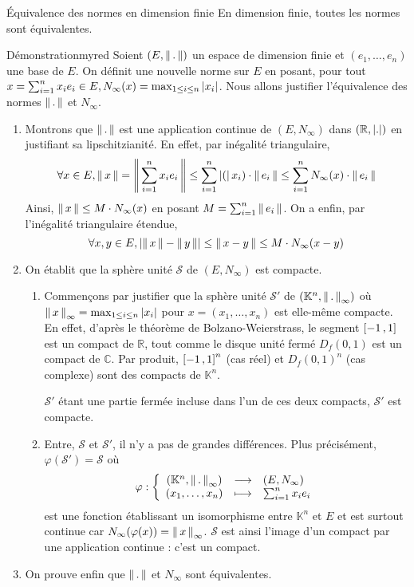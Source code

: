     \begin{theo}{Équivalence des normes en dimension finie}
        En dimension finie, toutes les normes sont équivalentes.
    \end{theo}

    \begin{demo}{Démonstration}{myred}
        Soient $\left(E, \left\lVert\,.\,\right\rVert\right)$ un espace de dimension finie et $(e_1,\ldots,e_n)$ une base de $E$. On définit une nouvelle norme sur $E$ en posant, pour tout $x = \sum_{i = 1}^n x_i e_i \in E, N_{\infty}(x) = \max_{1 \leq i \leq n} \left\lvert x_i\right\rvert$. Nous allons justifier l’équivalence des normes $\left\lVert\,.\,\right\rVert$ et $N_{\infty}$.
        \begin{enumerate}
            \item Montrons que $\left\lVert\,.\,\right\rVert$ est une application continue de $(E,N_{\infty})$ dans $(\mathbb{R}, \left\lvert .\right\rvert)$ en justifiant sa lipschitzianité. En effet, par inégalité triangulaire, 
            \[ \forall x \in E, \left\lVert\,x\,\right\rVert = \left\lVert\,\sum_{i = 1}^n x_i e_i\,\right\rVert \leq \sum_{i=1}^n \left\lvert (\right\rvert x_i) \cdot \left\lVert\,e_i\,\right\rVert \leq \sum_{i = 1}^n N_{\infty}(x) \cdot \left\lVert\,e_i\,\right\rVert \]
            Ainsi, $\left\lVert\,x\,\right\rVert \leq M \cdot N_{\infty}(x)$ en posant $M = \sum_{i = 1}^n \left\lVert\,e_i\,\right\rVert$. On a enfin, par l’inégalité triangulaire étendue, 
            \[ \forall x,y \in E, \left\lvert \left\lVert\,x\,\right\rVert - \left\lVert\,y\,\right\rVert\right\rvert \leq \left\lVert\,x-y\,\right\rVert \leq M \cdot N_{\infty} (x-y) \] 

            \item On établit que la sphère unité $\mathcal{S}$ de $(E, N_{\infty})$ est compacte. 
            \begin{enumerate}[label=(\alph*)]
                \item Commençons par justifier que la sphère unité $\mathcal{S}'$ de $\left(\mathbb{K}^n, \left\lVert\,.\,\right\rVert_{\infty}\right)$ où $\left\lVert\,x\,\right\rVert_{\infty} = \max_{1 \leq i \leq n} \left\lvert x_i\right\rvert$ pour $x = (x_1, \ldots, x_n)$ est elle-même compacte. En effet, d’après le théorème de Bolzano-Weierstrass, le segment $\left[ -1 \, , 1 \right]$ est un compact de $\mathbb{R}$, tout comme le disque unité fermé $D_f(0,1)$ est un compact de $\mathbb{C}$. Par produit, $\left[ -1 \, , 1 \right]^n$ (cas réel) et $D_f(0,1)^n$ (cas complexe) sont des compacts de $\mathbb{K}^n$. 
                
                $\mathcal{S}'$ étant une partie fermée incluse dans l’un de ces deux compacts, $\mathcal{S}'$ est compacte.

                \item Entre, $\mathcal{S}$ et $\mathcal{S}'$, il n’y a pas de grandes différences. Plus précisément, $\varphi(\mathcal{S}') = \mathcal{S}$ où 
                \[ \fonction{\varphi}{\left(\mathbb{K}^n, \norm{.}_{\infty}\right)}{\left(E,N_{\infty}\right)}{(x_1,\ldots,x_n)}{\sum_{i=1}^n x_i e_i} \] 
                est une fonction établissant un isomorphisme entre $\mathbb{K}^n$ et $E$ et est surtout continue car $N_{\infty} (\varphi(x)) = \left\lVert\,x\,\right\rVert_{\infty}$. $\mathcal{S}$ est ainsi l’image d’un compact par une application continue : c’est un compact.
            \end{enumerate}
            \item On prouve enfin que $\left\lVert\,.\,\right\rVert$ et $N_{\infty}$ sont équivalentes. 
            

\end{enumerate}
\end{demo}
